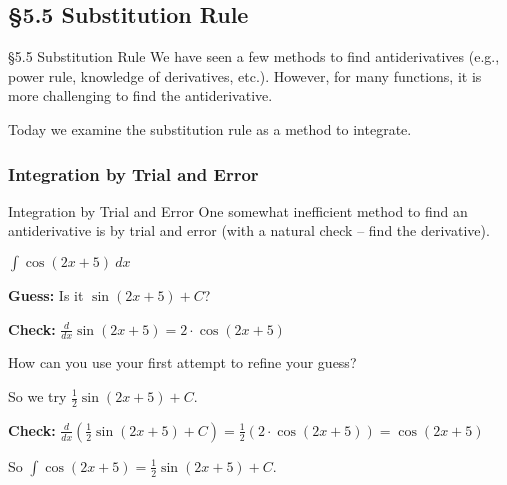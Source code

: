 \documentclass[cal1spr16Lectures.tex]{subfiles}
\begin{document}

\subsection[5.5 Substitution Rule]{\S 5.5 Substitution Rule}

\begin{frame}{\S 5.5 Substitution Rule}{}
We have seen a few methods to find antiderivatives (e.g., power rule, knowledge of derivatives, etc.).  However, for many functions, it is more challenging to find the antiderivative.

\vspace{1pc}
Today we examine the substitution rule as a method to integrate.
\end{frame}

\subsubsection{Integration by Trial and Error}

\begin{frame}{\small Integration by Trial and Error}\small
One somewhat inefficient method to find an antiderivative is by trial and error (with a natural check -- find the derivative).

\begin{ex}
$\int \cos{(2x+5)}\ dx$
\end{ex}
{\bf Guess:} Is it $\sin{(2x+5)} +C$?

\vspace{0.5pc}
{\bf Check:} $\frac{d}{dx}\sin{(2x+5)}=2\cdot\cos{(2x+5)}$

\begin{que}
How can you use your first attempt to refine your guess?
\end{que}
\end{frame}

\begin{frame}
So we try $\frac{1}{2}\sin{(2x+5)}+C$.

\vspace{0.5pc}
{\bf Check:} $\frac{d}{dx}\left(\frac{1}{2}\sin{(2x+5)}+C\right)=\frac{1}{2}(2\cdot \cos{(2x+5)})=\cos{(2x+5)}$

\vspace{1pc}
So $\int\cos{(2x+5)}=\frac{1}{2}\sin{(2x+5)} +C$.
\end{frame}
\end{document}
